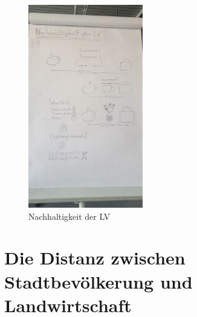 \documentclass{scrartcl}
\begin{document}
\begin{figure}[h]
\centering
\includegraphics[width=5cm]{image_folder/skizze1.jpg}
\caption{Nachhaltigkeit der LV}
\label{fig:Skizze_Nachhaltigkeit}
\end{figure}

\FloatBarrier

\section{Die Distanz zwischen Stadtbevölkerung und Landwirtschaft}
\end{document}
